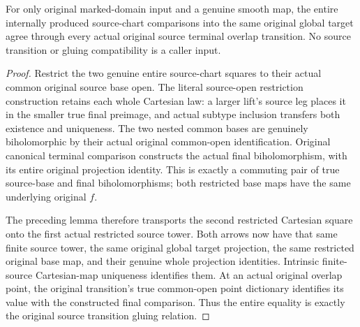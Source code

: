 \begin{theorem}
\label{hir:original-entire-source-terminal-chart-smooth-map-overlap-compatibility}
\leanok
{}
For only original marked-domain input and a genuine smooth map, the entire
internally produced source-chart comparisons into the same original global
target agree through every actual original source terminal overlap
transition. No source transition or gluing compatibility is a caller input.
\end{theorem}
\begin{proof}
Restrict the two genuine entire source-chart squares to their actual common
original source base open. The literal source-open restriction construction
retains each whole Cartesian law: a larger lift's source leg places it in
the smaller true final preimage, and actual subtype inclusion transfers
both existence and uniqueness. The two nested common bases are genuinely
biholomorphic by their actual original common-open identification. Original
canonical terminal comparison constructs the actual final
biholomorphism, with its entire original projection identity. This is
exactly a commuting pair of true source-base and final biholomorphisms;
both restricted base maps have the same underlying original $f$.

The preceding lemma therefore transports the second restricted Cartesian
square onto the first actual restricted source tower. Both arrows now
have that same finite source tower, the same original global target
projection, the same restricted original base map, and their genuine
whole projection identities. Intrinsic finite-source Cartesian-map
uniqueness identifies them. At an actual original overlap point, the
original transition's true common-open point dictionary identifies its
value with the constructed final comparison. Thus the entire equality
is exactly the original source transition gluing relation.
\end{proof}
